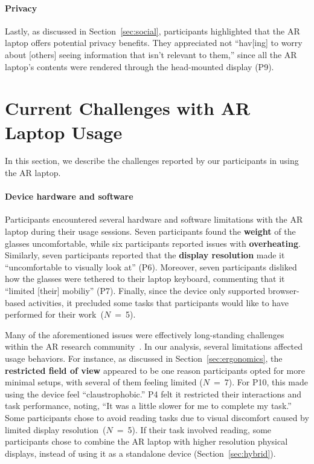 \paragraph{Privacy}
Lastly, as discussed in Section~\ref{sec:social},
participants highlighted that the AR laptop offers potential privacy benefits.
They appreciated not ``hav[ing] to worry about [others] seeing information that isn't relevant to them,'' since all the AR laptop's contents were rendered through the head-mounted display (P9).

\section{Current Challenges with AR Laptop Usage}
In this section, we describe the challenges reported by our participants in using the AR laptop. 

\paragraph{Device hardware and software}
Participants encountered several hardware and software limitations with the AR laptop during their usage sessions. 
Seven participants found the \textbf{weight} of the glasses uncomfortable, 
while six participants reported issues with \textbf{overheating}.
Similarly, 
seven participants reported that the \textbf{display resolution} made it ``uncomfortable to visually look at'' (P6). 
Moreover, seven participants disliked how the glasses were tethered to their laptop keyboard, commenting that it ``limited [their] mobiliy'' (P7).
Finally, since the device only supported browser-based activities, it precluded some tasks that participants would like to have performed for their work~($N$~=~5).

Many of the aforementioned issues were effectively long-standing challenges within the AR research community~\cite{kim2018revisitingtrendsar}.
In our analysis, several limitations affected usage behaviors. 
For instance, as discussed in Section~\ref{sec:ergonomics}, the \textbf{restricted field of view} appeared to be one reason participants opted for more minimal setups, with several of them feeling limited ($N$~=~7).
For P10, this made using the device feel ``claustrophobic.'' 
P4 felt it restricted their interactions and task performance, noting, ``It was a little slower for me to complete my task.''
Some participants chose to avoid reading tasks due to visual discomfort caused by limited display resolution~($N$~=~5).
If their task involved reading, some participants chose to combine the AR laptop with higher resolution physical displays, instead of using it as a standalone device (Section~\ref{sec:hybrid}).

